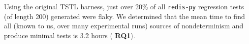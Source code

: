 {Using the original TSTL harness, just over 20\% of all {\tt redis-py}
regression tests (of length 200) generated were flaky.  We determined
that the mean time to find all (known to us, over many experimental runs)
sources of nondeterminism and produce minimal tests is 3.2 
hours ( {\bf RQ1}).

}
